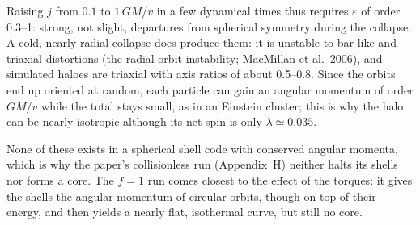 \documentclass[11pt,a4paper]{article}
\begin{document}
\begin{itemize}
\begin{equation*}
  \end{equation*}
  Raising $j$ from $0.1$ to $1\,GM/v$ in a few dynamical times thus requires
  $\varepsilon$ of order 0.3--1: strong, not slight, departures from spherical
  symmetry during the collapse. A cold, nearly radial collapse does produce them: it is
  unstable to bar-like and triaxial distortions (the radial-orbit instability;
  MacMillan et al.\ 2006), and simulated haloes are triaxial with axis ratios of
  about 0.5--0.8. Since the orbits end up oriented at random, each particle can gain
  an angular momentum of order $GM/v$ while the total stays small, as in an Einstein
  cluster; this is why the halo can be nearly isotropic although its net spin is only
  $\lambda\simeq0.035$.
\end{itemize}
None of these exists in a spherical shell code with conserved angular momenta,
which is why the paper's collisionless run (Appendix~H) neither halts its shells nor
forms a core. The $f=1$ run comes closest to the effect of the torques: it gives the
shells the angular momentum of circular orbits, though on top of their energy, and
then yields a nearly flat, isothermal curve, but still no core.
\end{document}
